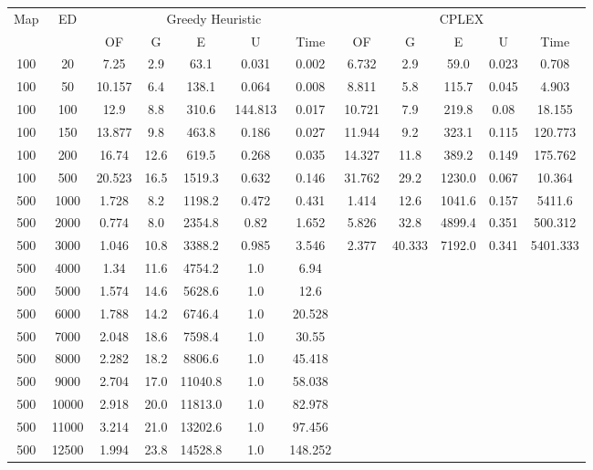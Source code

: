 \begin{table}[htb]
	\centering
	\begin{tabular}{|c|c|c|c|c|c|c|c|c|c|c|c|}
		\hline
		\multirow{2}{*}{Map} & \multirow{2}{*}{ED} & \multicolumn{5}{c|}{Greedy Heuristic} & \multicolumn{5}{c|}{CPLEX}\\ 
		\cline{3-12}
&& OF & G & E & U & Time & OF & G & E & U & Time\\ 
		\hline
		100 & 20 & 7.25 & 2.9 & 63.1 & 0.031 & 0.002 & 6.732 & 2.9 & 59.0 & 0.023 & 0.708 \\ 
		100 & 50 & 10.157 & 6.4 & 138.1 & 0.064 & 0.008 & 8.811 & 5.8 & 115.7 & 0.045 & 4.903 \\ 
		100 & 100 & 12.9 & 8.8 & 310.6 & 144.813 & 0.017 & 10.721 & 7.9 & 219.8 & 0.08 & 18.155 \\ 
		100 & 150 & 13.877 & 9.8 & 463.8 & 0.186 & 0.027 & 11.944 & 9.2 & 323.1 & 0.115 & 120.773 \\ 
		100 & 200 & 16.74 & 12.6 & 619.5 & 0.268 & 0.035 & 14.327 & 11.8 & 389.2 & 0.149 & 175.762 \\ 
		100 & 500 & 20.523 & 16.5 & 1519.3 & 0.632 & 0.146 & 31.762 & 29.2 & 1230.0 & 0.067 & 10.364 \\ 
		500 & 1000 & 1.728 & 8.2 & 1198.2 & 0.472 & 0.431 & 1.414 & 12.6 & 1041.6 & 0.157 & 5411.6 \\ 
		500 & 2000 & 0.774 & 8.0 & 2354.8 & 0.82 & 1.652 & 5.826 & 32.8 & 4899.4 & 0.351 & 500.312 \\ 
		500 & 3000 & 1.046 & 10.8 & 3388.2 & 0.985 & 3.546 & 2.377 & 40.333 & 7192.0 & 0.341 & 5401.333 \\ 
		500 & 4000 & 1.34 & 11.6 & 4754.2 & 1.0 & 6.94 & & & & &  \\ 
		500 & 5000 & 1.574 & 14.6 & 5628.6 & 1.0 & 12.6 & & & & &  \\ 
		500 & 6000 & 1.788 & 14.2 & 6746.4 & 1.0 & 20.528 & & & & &  \\ 
		500 & 7000 & 2.048 & 18.6 & 7598.4 & 1.0 & 30.55 & & & & &  \\ 
		500 & 8000 & 2.282 & 18.2 & 8806.6 & 1.0 & 45.418 & & & & &  \\ 
		500 & 9000 & 2.704 & 17.0 & 11040.8 & 1.0 & 58.038 & & & & &  \\ 
		500 & 10000 & 2.918 & 20.0 & 11813.0 & 1.0 & 82.978 & & & & &  \\ 
		500 & 11000 & 3.214 & 21.0 & 13202.6 & 1.0 & 97.456 & & & & &  \\ 
		500 & 12500 & 1.994 & 23.8 & 14528.8 & 1.0 & 148.252 & & & & &  \\ 

\end{tabular}
\end{table}

